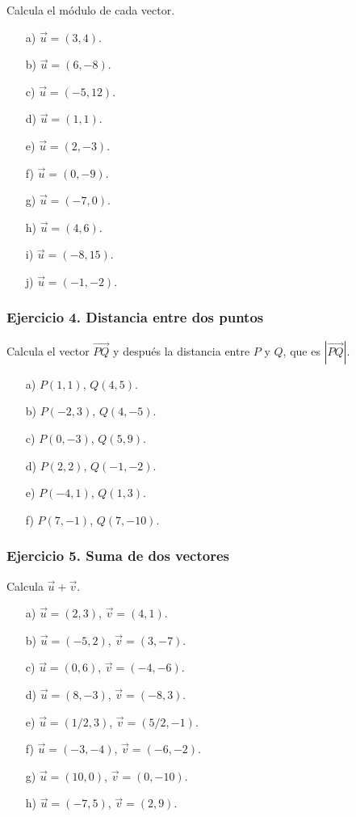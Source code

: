Calcula el módulo de cada vector.

\begin{enumerate}
    \item[a)] $\vec{u}=(3,4)$.
    \item[b)] $\vec{u}=(6,-8)$.
    \item[c)] $\vec{u}=(-5,12)$.
    \item[d)] $\vec{u}=(1,1)$.
    \item[e)] $\vec{u}=(2,-3)$.
    \item[f)] $\vec{u}=(0,-9)$.
    \item[g)] $\vec{u}=(-7,0)$.
    \item[h)] $\vec{u}=(4,6)$.
    \item[i)] $\vec{u}=(-8,15)$.
    \item[j)] $\vec{u}=(-1,-2)$.
\end{enumerate}

\subsubsection*{Ejercicio 4. Distancia entre dos puntos}

Calcula el vector $\overrightarrow{PQ}$ y después la distancia entre $P$ y $Q$, que es $|\overrightarrow{PQ}|$.

\begin{enumerate}
    \item[a)] $P(1,1)$, $Q(4,5)$.
    \item[b)] $P(-2,3)$, $Q(4,-5)$.
    \item[c)] $P(0,-3)$, $Q(5,9)$.
    \item[d)] $P(2,2)$, $Q(-1,-2)$.
    \item[e)] $P(-4,1)$, $Q(1,3)$.
    \item[f)] $P(7,-1)$, $Q(7,-10)$.
\end{enumerate}

\subsubsection*{Ejercicio 5. Suma de dos vectores}

Calcula $\vec{u}+\vec{v}$.

\begin{enumerate}
    \item[a)] $\vec{u}=(2,3)$, $\vec{v}=(4,1)$.
    \item[b)] $\vec{u}=(-5,2)$, $\vec{v}=(3,-7)$.
    \item[c)] $\vec{u}=(0,6)$, $\vec{v}=(-4,-6)$.
    \item[d)] $\vec{u}=(8,-3)$, $\vec{v}=(-8,3)$.
    \item[e)] $\vec{u}=(1/2,3)$, $\vec{v}=(5/2,-1)$.
    \item[f)] $\vec{u}=(-3,-4)$, $\vec{v}=(-6,-2)$.
    \item[g)] $\vec{u}=(10,0)$, $\vec{v}=(0,-10)$.
    \item[h)] $\vec{u}=(-7,5)$, $\vec{v}=(2,9)$.
\end{enumerate}

